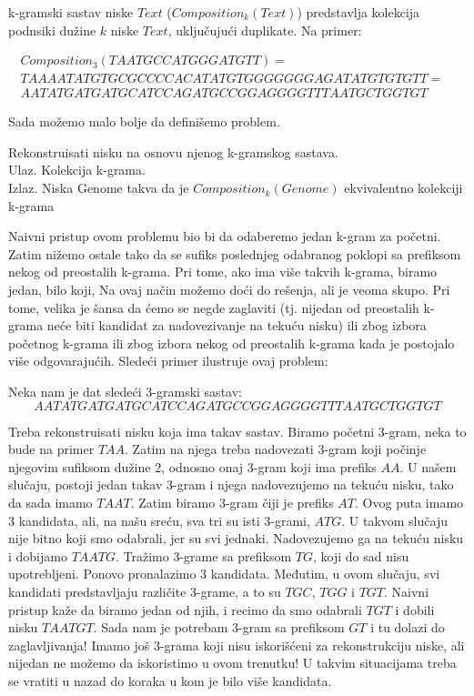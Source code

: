 k-gramski sastav niske $Text$ ($Composition_k(Text)$) predstavlja kolekcija podnsiki dužine $k$ niske $Text$, uključujući duplikate. Na primer:


\begin{align*}
	Composition_3(TAATGCCATGGGATGTT) =& \\
	TAA AAT ATG TGC GCC CCA CAT ATG TGG GGG GGA GAT ATG TGT GTT =& \\
	AAT ATG ATG ATG CAT CCA GAT GCC GGA GGG GTT TAA TGC TGG TGT
\end{align*}

Sada možemo malo bolje da definišemo problem.

\begin{problem}
	 Rekonstruisati nisku na osnovu njenog k-gramskog sastava.
	\\ Ulaz. Kolekcija k-grama.
	\\ Izlaz. Niska Genome takva da je $Composition_k(Genome)$ ekvivalentno kolekciji k-grama
\end{problem}


Naivni pristup ovom problemu bio bi da odaberemo jedan k-gram za početni. Zatim nižemo ostale tako da se sufiks poslednjeg odabranog poklopi sa prefiksom nekog od preostalih k-grama. Pri tome, ako ima više takvih k-grama, biramo jedan, bilo koji, Na ovaj način možemo doći do rešenja, ali je veoma skupo. Pri tome, velika je šansa da ćemo se negde zaglaviti (tj. nijedan od preostalih k-grama neće biti kandidat za nadovezivanje na tekuću nisku) ili zbog izbora početnog k-grama ili zbog izbora nekog od preostalih k-grama kada je postojalo više odgovarajućih. Sledeći primer ilustruje ovaj problem:

Neka nam je dat sledeći 3-gramski sastav: 
$$AAT ATG ATG ATG CAT CCA GAT GCC GGA GGG GTT TAA TGC TGG TGT$$

Treba rekonstruisati nisku koja ima takav sastav. Biramo početni 3-gram, neka to bude na primer $TAA$. Zatim na njega treba nadovezati 3-gram koji počinje njegovim sufiksom dužine 2, odnosno onaj 3-gram koji ima prefiks $AA$. U našem slučaju, postoji jedan takav 3-gram i njega nadovezujemo na tekuću nisku, tako da sada imamo $TAAT$. Zatim biramo 3-gram čiji je prefiks $AT$. Ovog puta imamo 3 kandidata, ali, na našu sreću, sva tri su isti 3-grami, $ATG$. U takvom slučaju nije bitno koji smo odabrali, jer su svi jednaki. Nadovezujemo ga na tekuću nisku i dobijamo $TAATG$. Tražimo 3-grame sa prefiksom $TG$, koji do sad nisu upotrebljeni. Ponovo pronalazimo 3 kandidata. Međutim, u ovom slučaju, svi kandidati predstavljaju različite 3-grame, a to su $TGC$, $TGG$ i $TGT$. Naivni pristup kaže da biramo jedan od njih, i recimo da smo odabrali $TGT$ i dobili nisku $TAATGT$. Sada nam je potrebam 3-gram sa prefiksom $GT$ i tu dolazi do zaglavljivanja! 
Imamo još 3-grama koji nisu iskorišćeni za rekonstrukciju niske, ali nijedan ne možemo da iskoristimo u ovom trenutku! U takvim situacijama treba se vratiti u nazad do koraka u kom je bilo više kandidata.


